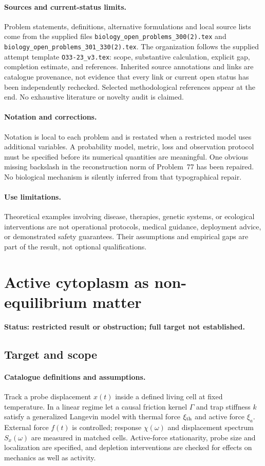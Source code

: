 \documentclass[11pt]{article}
\begin{document}
\paragraph{Sources and current-status limits.}
Problem statements, definitions, alternative formulations and local source lists
come from the supplied files
\texttt{biology\_open\_problems\_300(2).tex} and
\texttt{biology\_open\_problems\_301\_330(2).tex}.
The organization follows the supplied attempt template
\texttt{O33-23\_v3.tex}: scope, substantive calculation, explicit gap,
completion estimate, and references. Inherited source annotations and links are
catalogue provenance, not evidence that every link or current open status has
been independently rechecked. Selected methodological references appear at the
end. No exhaustive literature or novelty audit is claimed.

\paragraph{Notation and corrections.}
Notation is local to each problem and is restated when a restricted model uses
additional variables. A probability model, metric, loss and observation protocol
must be specified before its numerical quantities are meaningful. One obvious
missing backslash in the reconstruction norm of Problem~77 has been repaired.
No biological mechanism is silently inferred from that typographical repair.

\paragraph{Use limitations.}
Theoretical examples involving disease, therapies, genetic systems, or ecological
interventions are not operational protocols, medical guidance, deployment advice,
or demonstrated safety guarantees. Their assumptions and empirical gaps are part
of the result, not optional qualifications.


\section*{Active cytoplasm as non-equilibrium matter}
\label{prob:091}
\noindent\textbf{Status: restricted result or obstruction; full target not established.}
\subsection{Target and scope}
\paragraph{Catalogue definitions and assumptions.}
Track a probe displacement $x(t)$ inside a defined living cell at fixed temperature. In a linear regime let a causal friction kernel $\Gamma$ and trap stiffness $k$ satisfy a generalized Langevin model with thermal force $\xi_{\rm th}$ and active force $\xi_a$. External force $f(t)$ is controlled; response $\chi(\omega)$ and displacement spectrum $S_x(\omega)$ are measured in matched cells. Active-force stationarity, probe size and localization are specified, and depletion interventions are checked for effects on mechanics as well as activity.
\end{document}
